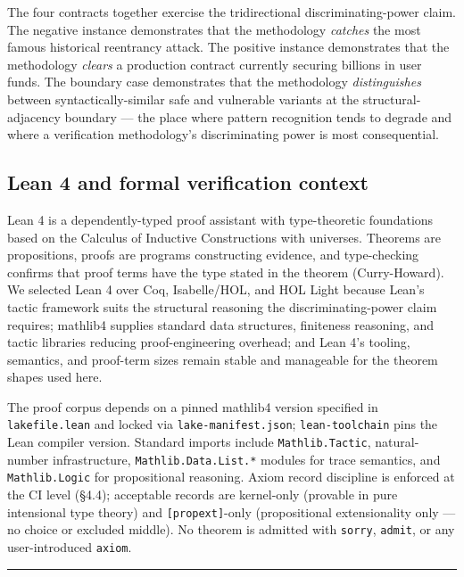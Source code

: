 The four contracts together exercise the tridirectional
discriminating-power claim. The negative instance demonstrates that the
methodology \emph{catches} the most famous historical reentrancy attack.
The positive instance demonstrates that the methodology \emph{clears} a
production contract currently securing billions in user funds. The
boundary case demonstrates that the methodology \emph{distinguishes}
between syntactically-similar safe and vulnerable variants at the
structural-adjacency boundary --- the place where pattern recognition
tends to degrade and where a verification methodology's discriminating
power is most consequential.

\subsection{Lean 4 and formal verification
context}\label{lean-4-and-formal-verification-context}

Lean 4 is a dependently-typed proof assistant with type-theoretic
foundations based on the Calculus of Inductive Constructions with
universes. Theorems are propositions, proofs are programs constructing
evidence, and type-checking confirms that proof terms have the type
stated in the theorem (Curry-Howard). We selected Lean 4 over Coq,
Isabelle/HOL, and HOL Light because Lean's tactic framework suits the
structural reasoning the discriminating-power claim requires; mathlib4
supplies standard data structures, finiteness reasoning, and tactic
libraries reducing proof-engineering overhead; and Lean 4's tooling,
semantics, and proof-term sizes remain stable and manageable for the
theorem shapes used here.

The proof corpus depends on a pinned mathlib4 version specified in
\texttt{lakefile.lean} and locked via \texttt{lake-manifest.json};
\texttt{lean-toolchain} pins the Lean compiler version. Standard imports
include \texttt{Mathlib.Tactic}, natural-number infrastructure,
\texttt{Mathlib.Data.List.*} modules for trace semantics, and
\texttt{Mathlib.Logic} for propositional reasoning. Axiom record
discipline is enforced at the CI level (§4.4); acceptable records are
kernel-only (provable in pure intensional type theory) and
\texttt{{[}propext{]}}-only (propositional extensionality only --- no
choice or excluded middle). No theorem is admitted with \texttt{sorry},
\texttt{admit}, or any user-introduced \texttt{axiom}.

\begin{center}\rule{0.5\linewidth}{0.5pt}\end{center}

